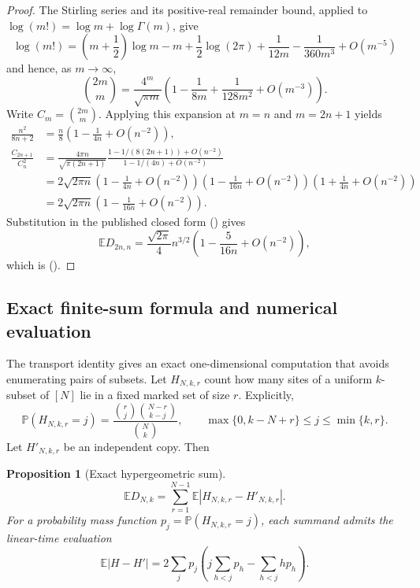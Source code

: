 \documentclass[twoside,10pt]{article}
\numberwithin{equation}{section}
\theoremstyle{slbody}
\newtheorem{proposition}[theorem]{Proposition}
\theoremstyle{definition}
\theoremstyle{remark}
\newcommand{\E}{\mathbb{E}}
\newcommand{\Pp}{\mathbb{P}}
\newcommand{\1}{\mathbf{1}}
\renewcommand{\eqref}[1]{%
  \textup{{\normalfont(\oldstylenums{\ref{#1}}}\normalfont)}}
\begin{document}
\begin{proof}
The Stirling series and its positive-real remainder bound, applied to
$\log(m!)=\log m+\log\Gamma(m)$,
\cite[\href{https://dlmf.nist.gov/5.11.E1}{Eq.~(5.11.1)} and
\href{https://dlmf.nist.gov/5.11.ii}{Section~5.11(ii)}]{NISTDLMF} give
\[
 \log(m!)=\left(m+\frac12\right)\log m-m+\frac12\log(2\pi)
 +\frac1{12m}-\frac1{360m^3}+O(m^{-5})
\]
and hence, as $m\to\infty$,
\[
 \binom{2m}{m}
 =\frac{4^m}{\sqrt{\pi m}}
  \left(1-\frac1{8m}+\frac1{128m^2}+O(m^{-3})\right).
\]
Write $C_m=\binom{2m}{m}$.  Applying this expansion at $m=n$ and
$m=2n+1$ yields
\begin{align*}
 \frac{n^2}{8n+2}
 &=\frac n8\left(1-\frac1{4n}+O(n^{-2})\right),\\
 \frac{C_{2n+1}}{C_n^2}
 &=\frac{4\pi n}{\sqrt{\pi(2n+1)}}
   \frac{1-1/(8(2n+1))+O(n^{-2})}
        {1-1/(4n)+O(n^{-2})}\\
 &=2\sqrt{2\pi n}
   \left(1-\frac1{4n}+O(n^{-2})\right)
   \left(1-\frac1{16n}+O(n^{-2})\right)
   \left(1+\frac1{4n}+O(n^{-2})\right)\\
 &=2\sqrt{2\pi n}
   \left(1-\frac1{16n}+O(n^{-2})\right).
\end{align*}
Substitution in the published closed form
\eqref{eq:central-closed-form} gives
\[
 \E D_{2n,n}
 =\frac{\sqrt{2\pi}}4n^{3/2}
  \left(1-\frac5{16n}+O(n^{-2})\right),
\]
which is \eqref{eq:finite-size}.
\end{proof}

\subsection{Exact finite-sum formula and numerical evaluation}

The transport identity gives an exact one-dimensional computation that avoids
enumerating pairs of subsets.  Let $H_{N,k,r}$ count how many sites of a
uniform $k$-subset of $[N]$ lie in a fixed marked set of size $r$.  Explicitly,
\[
 \Pp(H_{N,k,r}=j)
 =\frac{\binom rj\binom{N-r}{k-j}}{\binom Nk},
 \qquad
 \max\{0,k-N+r\}\leq j\leq\min\{k,r\}.
\]
Let $H'_{N,k,r}$ be an independent copy.  Then
\begin{proposition}[Exact hypergeometric sum]\label{prop:exact-computation}
\[
 \E D_{N,k}=\sum_{r=1}^{N-1}
 \E|H_{N,k,r}-H'_{N,k,r}|.
\]
For a probability mass function $p_j=\Pp(H_{N,k,r}=j)$, each summand admits
the linear-time evaluation
\[
 \E|H-H'|
 =2\sum_jp_j\left(j\sum_{h<j}p_h-\sum_{h<j}hp_h\right).
\]
\end{proposition}
\end{document}
